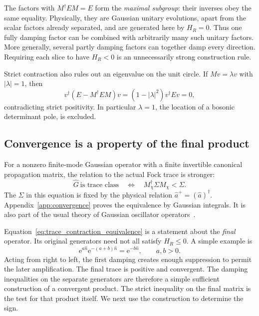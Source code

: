 \documentclass[11pt,a4paper]{article}
\newcommand{\ee}{\mathrm e}
\numberwithin{equation}{section}
\begin{document}
The factors with $M^\dagger EM=E$ form the \emph{maximal subgroup}: their
inverses obey the same equality. Physically, they are Gaussian unitary
evolutions, apart from the scalar factors already separated, and are
generated here by $H_R=0$. Thus one fully damping factor can be
combined with arbitrarily many such unitary factors. More generally, several
partly damping factors can together damp every direction. Requiring each
slice to have $H_R<0$ is an unnecessarily strong construction rule.

Strict contraction also rules out an eigenvalue on the unit circle. If
$Mv=\lambda v$ with $|\lambda|=1$, then
\begin{equation}
 v^\dagger(E-M^\dagger EM)v=(1-|\lambda|^2)v^\dagger Ev=0,
\end{equation}
contradicting strict positivity. In particular $\lambda=1$, the location of
a bosonic determinant pole, is excluded.

\subsection{Convergence is a property of the final product}
\label{sec:endpoint}

For a nonzero finite-mode Gaussian operator with a finite invertible canonical
propagation matrix, the relation to the actual Fock trace is stronger:
\begin{equation}
 \boxed{\hat G\ \text{is trace class}
 \quad\Longleftrightarrow\quad
 M_\chi^\dagger\Sigma M_\chi<\Sigma.}
 \label{eq:trace_contraction_equivalence}
\end{equation}
The $\Sigma$ in this equation is fixed by the physical relation
$\hat a^+=(\hat a)^\dagger$. Appendix~\ref{app:convergence} proves the
equivalence by Gaussian integrals. It is also part of the usual theory of
Gaussian oscillator operators~\cite{hilgert1989,derezinski2017}.

Equation~\eqref{eq:trace_contraction_equivalence} is a statement about the
\emph{final} operator. Its original generators need not all satisfy
$H_R\leq0$. A simple example is
\begin{equation}
 \ee^{a\hat n}\ee^{-(a+b)\hat n}=\ee^{-b\hat n},
 \qquad a,b>0.
 \label{eq:growth_cancellation}
\end{equation}
Acting from right to left, the first damping creates enough suppression to
permit the later amplification. The final trace is positive and convergent.
The damping inequalities on the separate generators are therefore a
simple sufficient construction of a convergent product. The strict
inequality on the final matrix is the test for that product itself.
We next use the construction to determine the sign.
\end{document}
